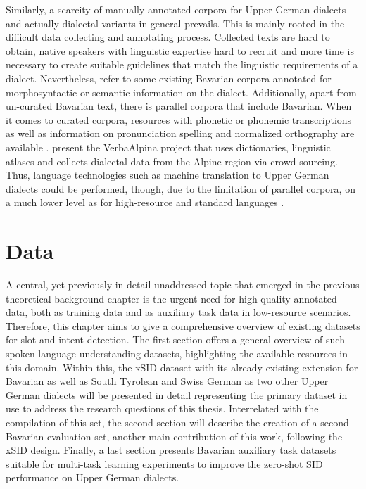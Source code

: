 \documentclass[11pt,a4paper,twoside,openright]{scrbook}
\begin{document}
Similarly, a scarcity of manually annotated corpora for Upper German dialects and actually dialectal variants in general \citep{blaschke-etal-2024-maibaam-multi} prevails. This is mainly rooted in the difficult data collecting and annotating process. Collected texts are hard to obtain, native speakers with linguistic expertise hard to recruit and more time is necessary to create suitable guidelines that match the linguistic requirements of a dialect. Nevertheless, \citet{blaschke-etal-2023-survey} refer to some existing Bavarian corpora annotated for morphosyntactic or semantic information on the dialect. Additionally, apart from un-curated Bavarian text, there is parallel corpora that include Bavarian. When it comes to curated corpora, resources with phonetic or phonemic transcriptions as well as information on pronunciation spelling and normalized orthography are available \citep{blaschke-etal-2023-survey}. \citet{VergeinerBülow+2023} present the VerbaAlpina project that uses dictionaries, linguistic atlases and collects dialectal data from the Alpine region via crowd sourcing. Thus, language technologies such as machine translation to Upper German dialects could be performed, though, due to the limitation of parallel corpora, on a much lower level as for high-resource and standard languages \citep{blaschke2024dialectsurvey, hedderich-etal-2021-survey,Zampieri_Nakov_Scherrer_2020}. 










\chapter{Data}

A central, yet previously in detail unaddressed topic that emerged in the previous theoretical background chapter is the urgent need for high-quality annotated data, both as training data and as auxiliary task data in low-resource scenarios. Therefore, this chapter aims to give a comprehensive overview of existing datasets for slot and intent detection. The first section offers a general overview of such spoken language understanding datasets, highlighting the available resources in this domain. Within this, the xSID dataset \citep{van-der-goot-etal-2021-masked} with its already existing extension for Bavarian as well as South Tyrolean and Swiss German as two other Upper German dialects will be presented in detail representing the primary dataset in use to address the research questions of this thesis. Interrelated with the compilation of this set, the second section will describe the creation of a second Bavarian evaluation set, another main contribution of this work, following the xSID design. Finally, a last section presents Bavarian auxiliary task datasets suitable for multi-task learning experiments to improve the zero-shot SID performance on Upper German dialects.
\end{document}
